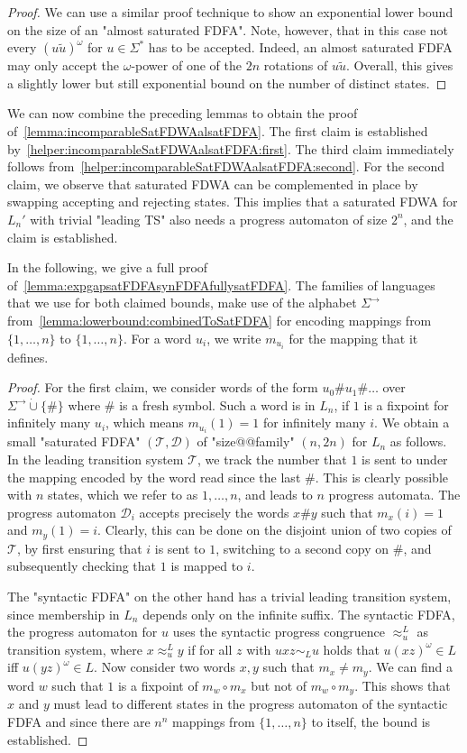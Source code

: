 \documentclass[a4paper,USenglish,cleveref,autoref,thm-restate]{lipics-v2021}
\newcommand{\mc}[1]{\ensuremath{\mathcal{#1}}}
\newcommand{\T}{\mc{T}}
\newcommand{\D}{\mc{D}}
\begin{document}
{\begin{proof}
  We can use a similar proof technique to show an exponential lower bound on the size of an "almost saturated FDFA".
  Note, however, that in this case not every $(u\tilde{u})^\omega$ for $u \in \Sigma^*$ has to be accepted.
  Indeed, an almost saturated FDFA may only accept the $\omega$-power of one of the $2n$ rotations of $u\tilde{u}$.
  Overall, this gives a slightly lower but still exponential bound on the number of distinct states.
\end{proof}

We can now combine the preceding lemmas to obtain the proof of~\cref{lemma:incomparableSatFDWAalsatFDFA}.
The first claim is established by~\cref{helper:incomparableSatFDWAalsatFDFA:first}.
The third claim immediately follows from~\cref{helper:incomparableSatFDWAalsatFDFA:second}.
For the second claim, we observe that saturated FDWA can be complemented in place by swapping accepting and rejecting states.
This implies that a saturated FDWA for $L_n'$ with trivial "leading TS" also needs a progress automaton of size $2^n$, and the claim is established.

In the following, we give a full proof of~\cref{lemma:expgapsatFDFAsynFDFAfullysatFDFA}.
The families of languages that we use for both claimed bounds, make use of the alphabet $\Sigma^\to$ from~\cref{lemma:lowerbound:combinedToSatFDFA} for encoding mappings from $\{1,\dots,n\}$ to $\{1,\dots,n\}$.
For a word $u_i$, we write $m_{u_i}$ for the mapping that it defines.

\expgapsatFDFAsynFDFAfullysatFDFA*
\begin{proof}
For the first claim, we consider words of the form $u_0\#u_1\#\dots$ over $\Sigma^\to\dot\cup\{\#\}$ where $\#$ is a fresh symbol.
Such a word is in $L_n$, if $1$ is a fixpoint for infinitely many $u_i$, which means $m_{u_i}(1) = 1$ for infinitely many $i$.
We obtain a small "saturated FDFA" $(\T, \D)$ of "size@@family" $(n,2n)$ for $L_n$ as follows.
In the leading transition system $\T$, we track the number that $1$ is sent to under the mapping encoded by the word read since the last $\#$.
This is clearly possible with $n$ states, which we refer to as $1,\dots, n$, and leads to $n$ progress automata.
The progress automaton $\D_i$ accepts precisely the words $x\#y$ such that $m_x(i) = 1$ and $m_y(1) = i$.
Clearly, this can be done on the disjoint union of two copies of $\T$, by first ensuring that $i$ is sent to $1$, switching to a second copy on $\#$, and subsequently checking that $1$ is mapped to $i$.

The "syntactic FDFA" on the other hand has a trivial leading transition system, since membership in $L_n$ depends only on the infinite suffix.
The syntactic FDFA, the progress automaton for $u$ uses the syntactic progress congruence $\approx_u^L$ as transition system, where $x\approx_u^L y$ if for all $z$ with $uxz\sim_L u$ holds that $u(xz)^\omega \in L$ iff $u(yz)^\omega \in L$.
Now consider two words $x, y$ such that $m_x \neq m_y$.
We can find a word $w$ such that $1$ is a fixpoint of $m_w \circ m_x$ but not of $m_w \circ m_y$.
This shows that $x$ and $y$ must lead to different states in the progress automaton of the syntactic FDFA and since there are $n^n$ mappings from $\{1,\dots,n\}$ to itself, the bound is established.


\end{proof}}
\end{document}
